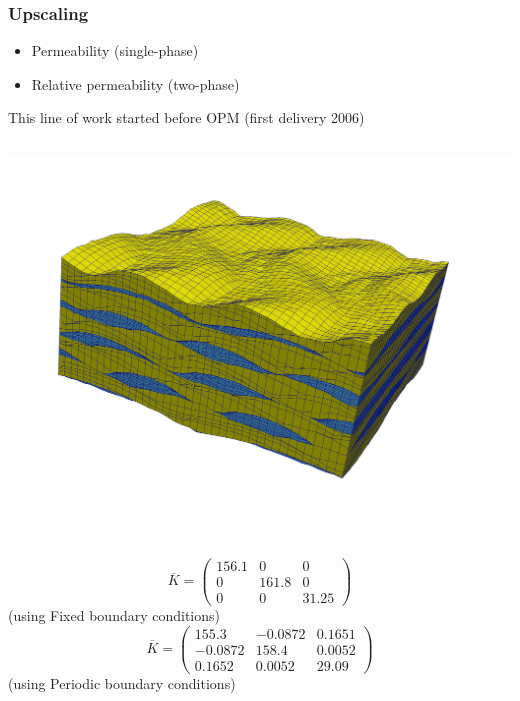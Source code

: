\documentclass[UKenglish,10pt]{beamer}
\begin{document}
\begin{frame}
  \frametitle{Upscaling}
  \begin{itemize}
  \item Permeability (single-phase)
  \item Relative permeability (two-phase)
  \end{itemize}
  \bigskip

  This line of work started before OPM (first delivery 2006)

  \begin{columns}[c]
    \includegraphics[width=1.2\textwidth]{figs/wave_orig_angled}
    \small
    \begin{equation*}
    \overline{K} =
    \left(
      \begin{array}{ccc}
        156.1 & 0 & 0 \\
        0 & 161.8 & 0 \\
        0 & 0 & 31.25
      \end{array}
    \right)
    \end{equation*}
    (using Fixed boundary conditions)
    \begin{equation*}
    \overline{K} =
    \left(
      \begin{array}{ccc}
        155.3 & -0.0872 & 0.1651 \\
        -0.0872 & 158.4 & 0.0052 \\
        0.1652 & 0.0052 & 29.09 
      \end{array}
    \right)
    \end{equation*}
    (using Periodic boundary conditions)
  \end{columns}
\end{frame}
\end{document}
